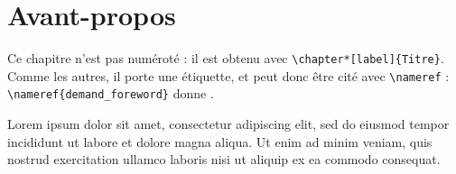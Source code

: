 \chapter*[demand_foreword]{Avant-propos}

Ce chapitre n'est pas numéroté : il est obtenu avec \verb|\chapter*[label]{Titre}|.
Comme les autres, il porte une étiquette, et peut donc être cité avec \verb|\nameref| : \verb|\nameref{demand_foreword}| donne .

Lorem ipsum dolor sit amet, consectetur adipiscing elit, sed do eiusmod tempor incididunt ut labore et dolore magna aliqua.
Ut enim ad minim veniam, quis nostrud exercitation ullamco laboris nisi ut aliquip ex ea commodo consequat.
